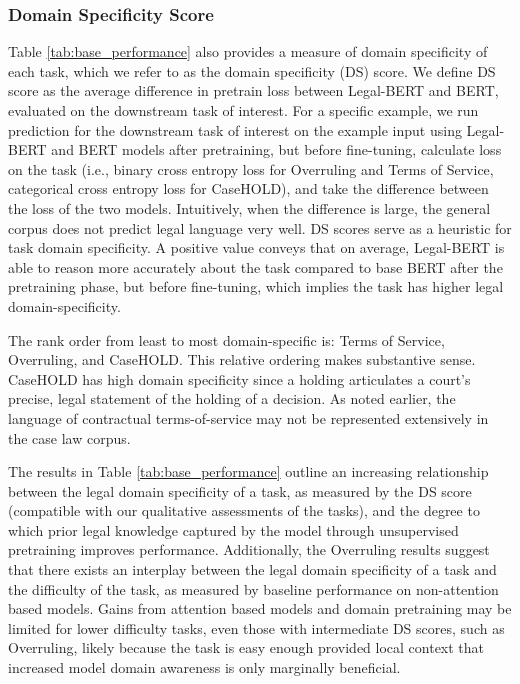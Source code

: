 \documentclass[sigconf]{acmart}
\begin{document}
\subsubsection{Domain Specificity Score}
Table \ref{tab:base_performance} also provides a measure of domain specificity of each task, which we refer to as the domain specificity (DS) score. We define DS score as the average difference in pretrain loss between Legal-BERT and BERT, evaluated on the downstream task of interest. For a specific example, we run prediction for the downstream task of interest on the example input using Legal-BERT and BERT models after pretraining, but before fine-tuning, calculate loss on the task (i.e., binary cross entropy loss for Overruling and Terms of Service, categorical cross entropy loss for CaseHOLD), and take the difference between the loss of the two models. Intuitively, when the difference is large, the general corpus does not predict legal language very well. DS scores serve as a heuristic for task domain specificity. A positive value conveys that on average, Legal-BERT is able to reason more accurately about the task compared to base BERT after the pretraining phase, but before fine-tuning, which implies the task has higher legal domain-specificity.

The rank order from least to most domain-specific is: Terms of Service, Overruling, and CaseHOLD. This relative ordering makes substantive sense. CaseHOLD has high domain specificity since a holding articulates a court's precise, legal statement of the holding of a decision.  As noted earlier, the language of contractual terms-of-service may not be represented extensively in the case law corpus.

The results in Table \ref{tab:base_performance} outline an increasing relationship between the legal domain specificity of a task, as measured by the DS score (compatible with our qualitative assessments of the tasks), and the degree to which prior legal knowledge captured by the model through unsupervised pretraining improves performance. Additionally, the Overruling results suggest that there exists an interplay between the legal domain specificity of a task and the difficulty of the task, as measured by baseline performance on non-attention based models. Gains from attention based models and domain pretraining may be limited for lower difficulty tasks, even those with intermediate DS scores, such as Overruling, likely because the task is easy enough provided local context that increased model domain awareness is only marginally beneficial.
\end{document}
